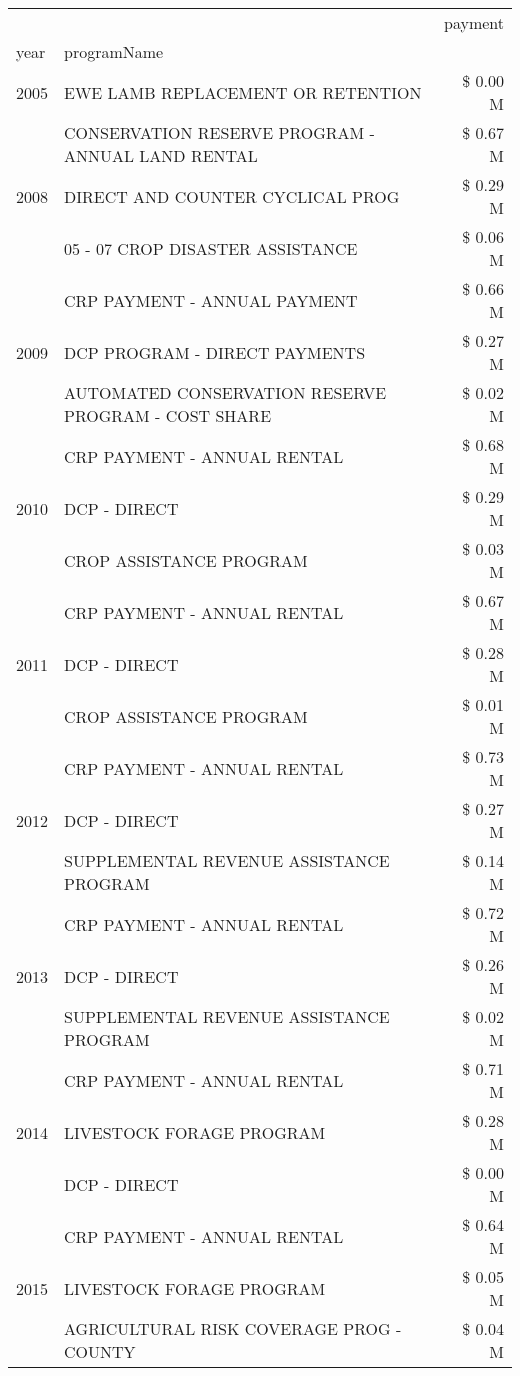 \begin{tabular}{llr}
\toprule
 &  & payment \\
year & programName &  \\
\midrule
2005 & EWE LAMB REPLACEMENT OR RETENTION & \$ 0.00 M \\
\cline{1-3}
\multirow[t]{3}{*}{2008} & CONSERVATION RESERVE PROGRAM - ANNUAL LAND RENTAL & \$ 0.67 M \\
 & DIRECT AND COUNTER CYCLICAL PROG & \$ 0.29 M \\
 & 05 - 07 CROP DISASTER ASSISTANCE & \$ 0.06 M \\
\cline{1-3}
\multirow[t]{3}{*}{2009} & CRP PAYMENT - ANNUAL PAYMENT & \$ 0.66 M \\
 & DCP PROGRAM - DIRECT PAYMENTS & \$ 0.27 M \\
 & AUTOMATED CONSERVATION RESERVE PROGRAM - COST SHARE & \$ 0.02 M \\
\cline{1-3}
\multirow[t]{3}{*}{2010} & CRP PAYMENT - ANNUAL RENTAL & \$ 0.68 M \\
 & DCP - DIRECT & \$ 0.29 M \\
 & CROP ASSISTANCE PROGRAM & \$ 0.03 M \\
\cline{1-3}
\multirow[t]{3}{*}{2011} & CRP PAYMENT - ANNUAL RENTAL & \$ 0.67 M \\
 & DCP - DIRECT & \$ 0.28 M \\
 & CROP ASSISTANCE PROGRAM & \$ 0.01 M \\
\cline{1-3}
\multirow[t]{3}{*}{2012} & CRP PAYMENT - ANNUAL RENTAL & \$ 0.73 M \\
 & DCP - DIRECT & \$ 0.27 M \\
 & SUPPLEMENTAL REVENUE ASSISTANCE PROGRAM & \$ 0.14 M \\
\cline{1-3}
\multirow[t]{3}{*}{2013} & CRP PAYMENT - ANNUAL RENTAL & \$ 0.72 M \\
 & DCP - DIRECT & \$ 0.26 M \\
 & SUPPLEMENTAL REVENUE ASSISTANCE PROGRAM & \$ 0.02 M \\
\cline{1-3}
\multirow[t]{3}{*}{2014} & CRP PAYMENT - ANNUAL RENTAL & \$ 0.71 M \\
 & LIVESTOCK FORAGE PROGRAM & \$ 0.28 M \\
 & DCP - DIRECT & \$ 0.00 M \\
\cline{1-3}
\multirow[t]{3}{*}{2015} & CRP PAYMENT - ANNUAL RENTAL & \$ 0.64 M \\
 & LIVESTOCK FORAGE PROGRAM & \$ 0.05 M \\
 & AGRICULTURAL RISK COVERAGE PROG - COUNTY & \$ 0.04 M \\

\end{tabular}
